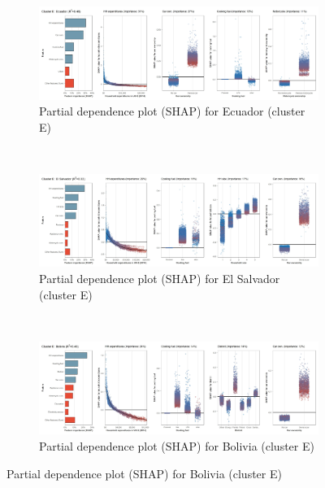 \begin{figure}[ht!]\ContinuedFloat
    \centering
   \begin{subfigure}[b]{\textwidth}
         \centering
         \caption{Partial dependence plot (SHAP) for Ecuador (cluster E)}
         \label{fig:5b_ECU}
         \includegraphics[width=\textwidth]{Figure 5b/Figure_5b_ECU}         
     \end{subfigure}
    \\
    \vspace{0.5cm}
   \begin{subfigure}[b]{\textwidth}
         \centering
         \caption{Partial dependence plot (SHAP) for El Salvador (cluster E)}
         \label{fig:5b_SLV}
         \includegraphics[width=\textwidth]{Figure 5b/Figure_5b_SLV}         
     \end{subfigure}
    \\
    \vspace{0.5cm}
   \begin{subfigure}[b]{\textwidth}
         \centering
         \caption{Partial dependence plot (SHAP) for Bolivia (cluster E)}
         \label{fig:5b_BOL}
         \includegraphics[width=\textwidth]{Figure 5b/Figure_5b_BOL}

\end{subfigure}
\end{figure}
